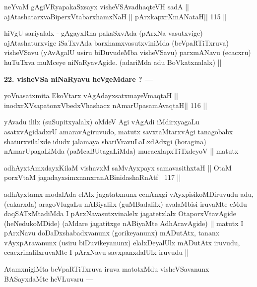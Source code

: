 \begin{shl}
neYvaM gAgiVRyapakaSxsayx visheVSAvadhaqteVH sadA ||
ajAtashatarxvaBiperxVtabarxhamxNaH || pArxkapxrXmANataH\hfill || 115 ||
\end{shl}

\begin{artha}
hiVgU sariyalalx - gAgayxRna pakaSxvAda (pArxNa vasutxvige) ajAtashaturxvige iSaTxvAda barxhamxvasutxviniMda (beVpaRTiTxruva) visheVSavu (yAvAgalU usiru biDuvudeMba visheVSavu) parxmANavu (ecacxru) huTuTxva muMceye niNaRyavAgide. (adariMda adu BoVkatxnalalx) ||
\end{artha}

\begin{artha}
{\bf 22. visheVSa niNaRyavu heVgeMdare ? ---}
\end{artha}

\begin{shl}
yoV\s nasatxmita EkoV\s tarx vAgAdayxsatxmayeV\s maqtaH ||
inodxrXV\s sapatonxV\s bedxVhashacx nAmarUpasamAvaqtaH\hfill || 116 ||
\end{shl}

\begin{artha}
yAvadu ililx (suSupitxyalalx) oMdeV Agi vAgAdi iMdirxyagaLu asatxvAgidadxrU amaravAgiruvudo, matutx savxtaMtarxvAgi tanagobabx shaturxvilalxde idudx jalamaya shariVravuLaLxdAdxgi (horagina) nAmarUpagaLiMda (paMcaBUtagaLiMda) mucacxlapxTiTxdeyoV || matutx
\end{artha}

\begin{shl}
adhAyxtAmxdayxKilaM vishavxM saMvAyxpayx samavasithxtaH ||
OtaM porxVtaM jagadayxsimxnanxranABinidashaRnAtf\hfill || 117 ||
\end{shl}

\begin{artha}
adhAyxtamx modalAda elAlx jagatatxnunx cenAnxgi vAyxpisikoMDiruvudu adu, (cakarxda) aragoVlugaLu nABiyalilx (guMBadalilx) avalaMbisi iruvaMte eMdu daqSATxMtadiMda I pArxNavasutxvinalelx jagatetxlalx OtaporxVtavAgide (heNedukoMDide) (aMdare jagatitxge nABiyaMte AdhAravAgide) || matutx I pArxNavu doDaDxshabadxvanunx (gorikeyanunx) mADutAtx, tananx vAyxpAravanunx (usiru biDuvikeyanunx) elalxDeyalUlx mADutAtx iruvudu, ecacxrinalilxruvaMte I pArxNavu savxpanxdalUlx iruvudu ||
\end{artha}

\begin{artha}
AtamxnigiMta beVpaRTiTxruva iruva matotxMdu visheVSavanunx BASayxdaMte heVLuvaru ---
\end{artha}

